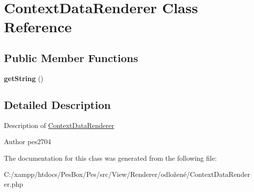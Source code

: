 \hypertarget{class_pes_1_1_view_1_1_renderer_1_1_context_data_renderer}{}\section{Context\+Data\+Renderer Class Reference}
\label{class_pes_1_1_view_1_1_renderer_1_1_context_data_renderer}
\subsection*{Public Member Functions}
\begin{DoxyCompactItemize}
\item 
\mbox{\label{class_pes_1_1_view_1_1_renderer_1_1_context_data_renderer_afde980915cc78c408e6ac75b662e631c}} 
{\bfseries get\+String} ()
\end{DoxyCompactItemize}


\subsection{Detailed Description}
Description of \mbox{\hyperlink{class_pes_1_1_view_1_1_renderer_1_1_context_data_renderer}{Context\+Data\+Renderer}}

\begin{DoxyAuthor}{Author}
pes2704 
\end{DoxyAuthor}


The documentation for this class was generated from the following file\+:\begin{DoxyCompactItemize}
\item 
C\+:/xampp/htdocs/\+Pes\+Box/\+Pes/src/\+View/\+Renderer/odložené/Context\+Data\+Renderer.\+php\end{DoxyCompactItemize}

